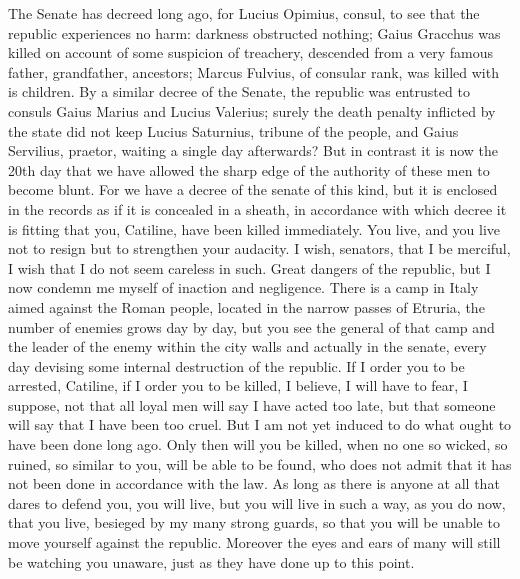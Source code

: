 \documentclass[a4paper]{article}
\begin{document}
\begin{pairs}
\begin{Rightside}
    The Senate has decreed long ago, for Lucius Opimius, consul, to see that the republic experiences no harm: darkness obstructed nothing; Gaius Gracchus was killed on account of some suspicion of treachery, descended from a very famous father, grandfather, ancestors; Marcus Fulvius, of consular rank, was killed with is children. By a similar decree of the Senate, the republic was entrusted to consuls Gaius Marius and Lucius Valerius; surely the death penalty inflicted by the state did not keep Lucius Saturnius, tribune of the people, and Gaius Servilius, praetor, waiting a single day afterwards? But in contrast it is now the 20th day that we have allowed the sharp edge of the authority of these men to become blunt. For we have a decree of the senate of this kind, but it is enclosed in the records as if it is concealed in a sheath, in accordance with which decree it is fitting that you, Catiline, have been killed immediately. You live, and you live not to resign but to strengthen your audacity. I wish, senators, that I be merciful, I wish that I do not seem careless in such. Great dangers of the republic, but I now condemn me myself of inaction and negligence.
    \pend
    \pstart
    There is a camp in Italy aimed against the Roman people, located in the narrow passes of Etruria, the number of enemies grows day by day, but you see the general of that camp and the leader of the enemy within the city walls and actually in the senate, every day devising some internal destruction of the republic. If I order you to be arrested, Catiline, if I order you to be killed, I believe, I will have to fear, I suppose, not that all loyal men will say I have acted too late, but that someone will say that I have been too cruel. But I am not yet induced to do what ought to have been done long ago. Only then will you be killed, when no one so wicked, so ruined, so similar to you, will be able to be found, who does not admit that it has not been done in accordance with the law.
    \pend
    \pstart
    As long as there is anyone at all that dares to defend you, you will live, but you will live in such a way, as you do now, that you live, besieged by my many strong guards, so that you will be unable to move yourself against the republic. Moreover the eyes and ears of many will still be watching you unaware, just as they have done up to this point.
    \pend
    \endnumbering
  \end{Rightside}
\end{pairs}
\Columns
\newpage
\end{document}
